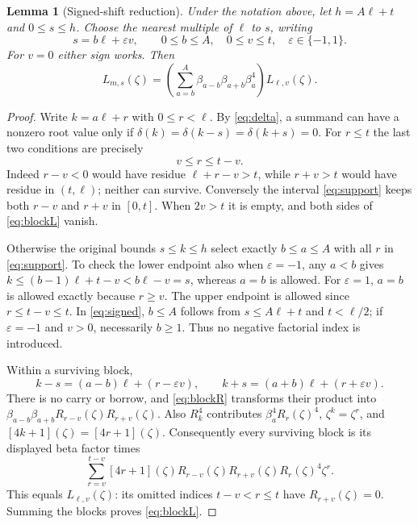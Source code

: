 \documentclass[11pt,a4paper]{article}
\newtheorem{lemma}[theorem]{Lemma}
\begin{document}
\begin{lemma}[Signed-shift reduction]
Under the notation above, let $h=A\ell+t$ and $0\leq s\leq h$.
Choose the nearest multiple of $\ell$ to $s$, writing
\begin{equation}
 s=b\ell+\varepsilon v,\qquad
 0\leq b\leq A,\quad 0\leq v\leq t,\quad
 \varepsilon\in\{-1,1\}.\label{eq:signed}
\end{equation}
For $v=0$ either sign works. Then
\begin{equation}
 L_{m,s}(\zeta)=
 \left(\sum_{a=b}^{A}\beta_{a-b}\beta_{a+b}\beta_a^4\right)
 L_{\ell,v}(\zeta).\label{eq:blockL}
\end{equation}
\end{lemma}
\begin{proof}
Write $k=a\ell+r$ with $0\leq r<\ell$. By \eqref{eq:delta}, a summand
can have a nonzero root value only if
$\delta(k)=\delta(k-s)=\delta(k+s)=0$. For $r\leq t$ the last two
conditions are precisely
\begin{equation}
 v\leq r\leq t-v.\label{eq:support}
\end{equation}
Indeed $r-v<0$ would have residue $\ell+r-v>t$, while $r+v>t$
would have residue in $(t,\ell)$; neither can survive. Conversely the
interval \eqref{eq:support} keeps both $r-v$ and $r+v$ in $[0,t]$.
When $2v>t$ it is empty, and both sides of \eqref{eq:blockL} vanish.

Otherwise the original bounds $s\leq k\leq h$ select exactly
$b\leq a\leq A$ with all $r$ in \eqref{eq:support}. To check the lower
endpoint also when $\varepsilon=-1$, any $a<b$ gives
$k\leq(b-1)\ell+t-v<b\ell-v=s$, whereas $a=b$ is allowed.
For $\varepsilon=1$, $a=b$ is allowed exactly because $r\geq v$.
The upper endpoint is allowed since $r\leq t-v\leq t$.
In \eqref{eq:signed}, $b\leq A$ follows from $s\leq A\ell+t$ and
$t<\ell/2$; if $\varepsilon=-1$ and $v>0$, necessarily $b\geq1$.
Thus no negative factorial index is introduced.

Within a surviving block,
\[
 k-s=(a-b)\ell+(r-\varepsilon v),\qquad
 k+s=(a+b)\ell+(r+\varepsilon v).
\]
There is no carry or borrow, and \eqref{eq:blockR} transforms their
product into $\beta_{a-b}\beta_{a+b}R_{r-v}(\zeta)R_{r+v}(\zeta)$.
Also $R_k^4$ contributes $\beta_a^4R_r(\zeta)^4$,
$\zeta^k=\zeta^r$, and $[4k+1](\zeta)=[4r+1](\zeta)$.
Consequently every surviving block is its displayed beta factor times
\[
 \sum_{r=v}^{t-v}[4r+1](\zeta)
 R_{r-v}(\zeta)R_{r+v}(\zeta)R_r(\zeta)^4\zeta^r.
\]
This equals $L_{\ell,v}(\zeta)$: its omitted indices
$t-v<r\leq t$ have $R_{r+v}(\zeta)=0$. Summing the blocks proves
\eqref{eq:blockL}.
\end{proof}
\end{document}
